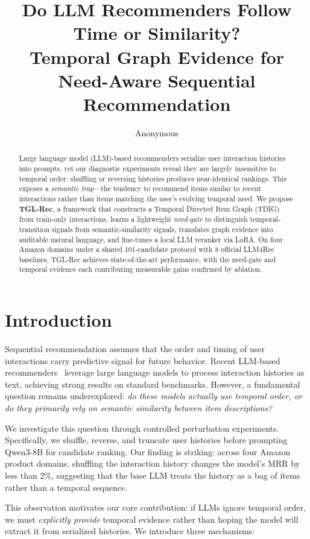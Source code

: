 \documentclass[10pt,twocolumn]{article}
\title{Do LLM Recommenders Follow Time or Similarity?\\
Temporal Graph Evidence for Need-Aware Sequential Recommendation}
\author{Anonymous}
\date{}
\begin{document}
\maketitle

\begin{abstract}
Large language model (LLM)-based recommenders serialize user interaction histories into prompts, yet our diagnostic experiments reveal they are largely insensitive to temporal order: shuffling or reversing histories produces near-identical rankings. This exposes a \emph{semantic trap}---the tendency to recommend items similar to recent interactions rather than items matching the user's evolving temporal need. We propose \textbf{TGL-Rec}, a framework that constructs a Temporal Directed Item Graph (TDIG) from train-only interactions, learns a lightweight \emph{need-gate} to distinguish temporal-transition signals from semantic-similarity signals, translates graph evidence into auditable natural language, and fine-tunes a local LLM reranker via LoRA. On four Amazon domains under a shared 101-candidate protocol with 8 official LLM4Rec baselines, TGL-Rec achieves state-of-the-art performance, with the need-gate and temporal evidence each contributing measurable gains confirmed by ablation.
\end{abstract}

\section{Introduction}

Sequential recommendation assumes that the order and timing of user interactions carry predictive signal for future behavior. Recent LLM-based recommenders~\cite{llm2rec,llmesr,rlmrec} leverage large language models to process interaction histories as text, achieving strong results on standard benchmarks. However, a fundamental question remains underexplored: \emph{do these models actually use temporal order, or do they primarily rely on semantic similarity between item descriptions?}

We investigate this question through controlled perturbation experiments. Specifically, we shuffle, reverse, and truncate user histories before prompting Qwen3-8B for candidate ranking. Our finding is striking: across four Amazon product domains, shuffling the interaction history changes the model's MRR by less than 2\%, suggesting that the base LLM treats the history as a bag of items rather than a temporal sequence.

This observation motivates our core contribution: if LLMs ignore temporal order, we must \emph{explicitly provide} temporal evidence rather than hoping the model will extract it from serialized histories. We introduce three mechanisms:
\end{document}

